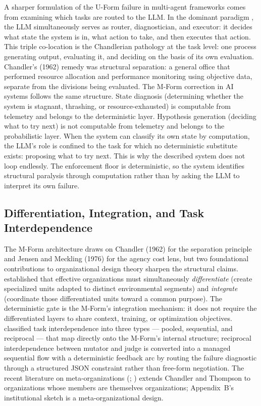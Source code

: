 \documentclass[11pt]{article}
\begin{document}
A sharper formulation of the U-Form failure in multi-agent frameworks comes from examining which tasks are routed to the LLM. In the dominant paradigm \citep{yao2023react,yang2024swe,richards2023autogpt}, the LLM simultaneously serves as router, diagnostician, and executor: it decides what state the system is in, what action to take, and then executes that action. This triple co-location is the Chandlerian pathology at the task level: one process generating output, evaluating it, and deciding on the basis of its own evaluation. Chandler's (1962) remedy was structural separation: a general office that performed resource allocation and performance monitoring using objective data, separate from the divisions being evaluated. The M-Form correction in AI systems follows the same structure. State diagnosis (determining whether the system is stagnant, thrashing, or resource-exhausted) is computable from telemetry and belongs to the deterministic layer. Hypothesis generation (deciding what to try next) is not computable from telemetry and belongs to the probabilistic layer. When the system can classify its own state by computation, the LLM's role is confined to the task for which no deterministic substitute exists: proposing what to try next. This is why the described system does not loop endlessly. The enforcement floor is deterministic, so the system identifies structural paralysis through computation rather than by asking the LLM to interpret its own failure.

\subsection{Differentiation, Integration, and Task Interdependence}

The M-Form architecture draws on Chandler (1962) for the separation principle and Jensen and Meckling (1976) for the agency cost lens, but two foundational contributions to organizational design theory sharpen the structural claims. \citet{lawrence1967} established that effective organizations must simultaneously \emph{differentiate} (create specialized units adapted to distinct environmental segments) and \emph{integrate} (coordinate those differentiated units toward a common purpose). The deterministic gate is the M-Form's integration mechanism: it does not require the differentiated layers to share context, training, or optimization objectives. \citet{thompson1967} classified task interdependence into three types --- pooled, sequential, and reciprocal --- that map directly onto the M-Form's internal structure; reciprocal interdependence between mutator and judge is converted into a managed sequential flow with a deterministic feedback arc by routing the failure diagnostic through a structured JSON constraint rather than free-form negotiation. The recent literature on meta-organizations (\citealp{ahrne2008}; \citealp{berkowitz2016}) extends Chandler and Thompson to organizations whose members are themselves organizations; Appendix~B's institutional sketch is a meta-organizational design.
\end{document}
